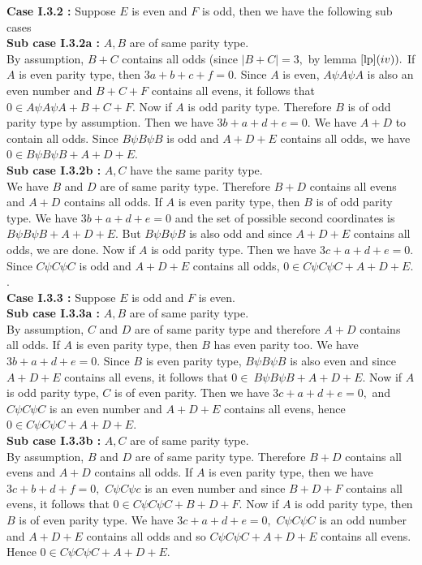 \documentclass[reqno,10pt]{amsart}
\begin{document}
\textbf{Case I.3.2 :} Suppose $E$ is even and $F$ is odd, then we have the following sub cases \\
\textbf{Sub case I.3.2a :} $A,B$ are of same parity type. \\ By assumption, $B+C$ contains all odds (since $|B+C|=3,$ by lemma $\ref{lp} (iv)).$ If $A$ is even parity type, then $3a+b+c+f=0.$ Since $A$ is even, $A \psi A \psi A$ is also an even number and  $B+C+F$ contains all evens, it follows that $0 \in A \psi A \psi A + B + C + F.$ Now if $A$ is odd parity type. Therefore $B$ is of odd parity type by assumption. Then we have $3b+a+d+e = 0.$  We have $A+D$ to contain all odds. Since $ B \psi B \psi B$ is odd and $A+D+E$ contains all odds, we have $ 0 \in  B \psi B \psi B + A + D + E.$ \\
\textbf{Sub case I.3.2b :} $A,C$ have the same parity type.\\
 We have $B$ and
$D$ are of same parity type. Therefore $B+D$ contains all evens and $A+D$ contains all odds. If $A$ is even parity type, then $B$ is of odd parity type. We have $3b+a+d+e=0$ and the set of possible second coordinates is $B \psi B \psi B+ A+D+E$. But $B \psi B \psi B$ is also odd and since $A+D+E$ contains all odds, we are done. Now if $A$ is odd parity type. Then we have $3c+a+d+e = 0.$ Since $ C \psi C \psi C$ is odd and $A+D+E$ contains all odds,  $ 0 \in C \psi C \psi C + A + D + E.$. \\
\textbf{Case I.3.3 : } Suppose $E$ is odd and $F$ is even.\\
\textbf{Sub case I.3.3a :} $A,B$ are of same parity type. \\ By assumption, $C$ and $D$ are of same parity type and therefore $A+D$ contains all odds. If $A$ is even parity type, then $B$ has even parity too. We have $3b+a+d+e=0.$   Since $B$ is even parity type, $B \psi B \psi B$ is also even and since $A+D+E$ contains all evens, it follows that $0 \in \ B \psi B \psi B + A+D+E.$  Now if $A$ is odd parity type, $C$ is of even parity. Then we have $3c+a+d+e = 0,$ and $ C \psi C \psi C$ is an even number and $A+D+E$ contains all evens, hence $0 \in C \psi C \psi C + A + D + E.$\\
\textbf{Sub case I.3.3b :} $A,C$ are of same parity type. \\ By assumption, $B$ and $D$ are of same parity type. Therefore $B+D$ contains all evens and $A+D$ contains all odds. If $A$ is even parity type, then we have $3c+b+d+f=0,$  $C \psi C \psi c$ is an even number and since $B+D+F$ contains all evens, it follows that $0 \in C \psi C \psi C + B+D+F.$ Now if $A$ is odd parity type, then $B$ is of even parity type. We have $3c+a+d+e = 0,$   $ C\psi C\psi C$ is an odd number  and $A+D+E$ contains all odds and so $ C \psi C \psi C + A + D + E$ contains all evens. Hence $ 0 \in C \psi C \psi C + A + D + E.$ \\
\end{document}
